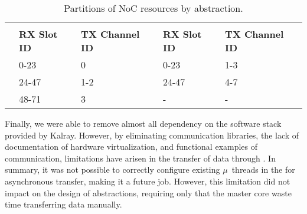 			\begin{table}[!tb]
				\centering%
				\caption{Partitions of NoC resources by abstraction.}%
				\label{tab.noc-resources}%

				\begin{tabular}{l|l|l|l|l|}
					\cline{2-5}
															& \multicolumn{2}{c|}{\textbf{\cnoc}}          & \multicolumn{2}{c|}{\textbf{\dnoc}}          \\ \cline{2-5}
															& \textbf{RX Slot ID} & \textbf{TX Channel ID} & \textbf{RX Slot ID} & \textbf{TX Channel ID} \\ \hline
					\multicolumn{1}{|l|}{\textbf{\mailbox}} & 0-23                & 0                      & 0-23                & 1-3                    \\ \hline
					\multicolumn{1}{|l|}{\textbf{\portal}}  & 24-47               & 1-2                    & 24-47               & 4-7                    \\ \hline
					\multicolumn{1}{|l|}{\textbf{\sync}}    & 48-71               & 3                      & -                   & -                      \\ \hline
				\end{tabular}

			\end{table}


			Finally, we were able to remove almost all dependency on the software
			stack provided by Kalray. However, by eliminating communication
			libraries, the lack of documentation of hardware virtualization,
			and functional examples of communication, limitations have arisen
			in the transfer of data through \dnoc. In summary, it was not possible
			to correctly configure existing $\mu$~threads in the \dma for asynchronous
			transfer, making it a future job. However, this limitation did not
			impact on the design of abstractions, requiring only that the master
			core waste time transferring data manually.

